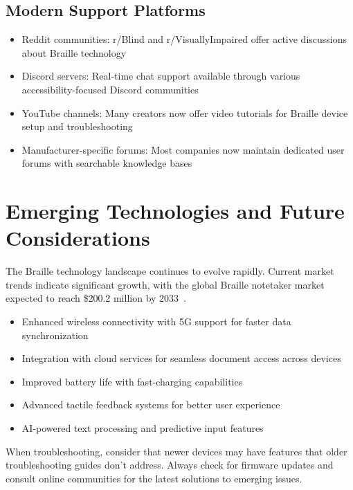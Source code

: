 \subsection{Modern Support Platforms}
\begin{itemize}
 \item Reddit communities: r/Blind and r/VisuallyImpaired offer active discussions about Braille technology
 \item Discord servers: Real-time chat support available through various accessibility-focused Discord communities
 \item YouTube channels: Many creators now offer video tutorials for Braille device setup and troubleshooting
 \item Manufacturer-specific forums: Most companies now maintain dedicated user forums with searchable knowledge bases
\end{itemize}

\section{Emerging Technologies and Future Considerations}\label{emerging}
The Braille technology landscape continues to evolve rapidly. Current market trends indicate significant growth, with the global Braille notetaker market expected to reach \$200.2 million by 2033~\cite{BrailleMarketResearch}.

\begin{itemize}
 \item Enhanced wireless connectivity with 5G support for faster data synchronization
 \item Integration with cloud services for seamless document access across devices
 \item Improved battery life with fast-charging capabilities
 \item Advanced tactile feedback systems for better user experience
 \item AI-powered text processing and predictive input features
\end{itemize}

When troubleshooting, consider that newer devices may have features that older troubleshooting guides don't address. Always check for firmware updates and consult online communities for the latest solutions to emerging issues.
